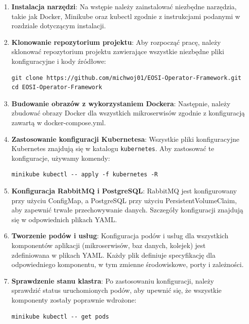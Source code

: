 \documentclass[polish]{aghengthesis}
\begin{document}
\begin{enumerate}
    \item \textbf{Instalacja narzędzi}:
    Na wstępie należy zainstalować niezbędne narzędzia, takie jak Docker, Minikube oraz kubectl zgodnie z instrukcjami podanymi w rozdziale dotyczącym instalacji.

    \item \textbf{Klonowanie repozytorium projektu}:
    Aby rozpocząć pracę, należy sklonować repozytorium projektu zawierające wszystkie niezbędne pliki konfiguracyjne i kody źródłowe:

\begin{lstlisting}[basicstyle=\ttfamily, numbers=none]
git clone https://github.com/michwoj01/EOSI-Operator-Framework.git
cd EOSI-Operator-Framework\end{lstlisting}

    \item \textbf{Budowanie obrazów z wykorzystaniem Dockera}:
    Następnie, należy zbudować obrazy Docker dla wszystkich mikroserwisów zgodnie z konfiguracją zawartą w docker-compose.yml.

    \item \textbf{Zastosowanie konfiguracji Kubernetesa}:
    Wszystkie pliki konfiguracyjne Kubernetes znajdują się w katalogu \texttt{kubernetes}. Aby zastosować te konfiguracje, używamy komendy:

\begin{lstlisting}[basicstyle=\ttfamily, numbers=none]
minikube kubectl -- apply -f kubernetes -R\end{lstlisting}

    \item \textbf{Konfiguracja RabbitMQ i PostgreSQL}:
    RabbitMQ jest konfigurowany przy użyciu ConfigMap, a PostgreSQL przy użyciu PersistentVolumeClaim, aby zapewnić trwałe przechowywanie danych. Szczegóły konfiguracji znajdują się w odpowiednich plikach YAML.

    \item \textbf{Tworzenie podów i usług}:
    Konfiguracja podów i usług dla wszystkich komponentów aplikacji (mikroserwisów, baz danych, kolejek) jest zdefiniowana w plikach YAML. Każdy plik definiuje specyfikację dla odpowiedniego komponentu, w tym zmienne środowiskowe, porty i zależności.

    \item \textbf{Sprawdzenie stanu klastra}:
    Po zastosowaniu konfiguracji, należy sprawdzić status uruchomionych podów, aby upewnić się, że wszystkie komponenty zostały poprawnie wdrożone:
\begin{lstlisting}[basicstyle=\ttfamily, numbers=none]
minikube kubectl -- get pods\end{lstlisting}


\end{enumerate}
\end{document}
